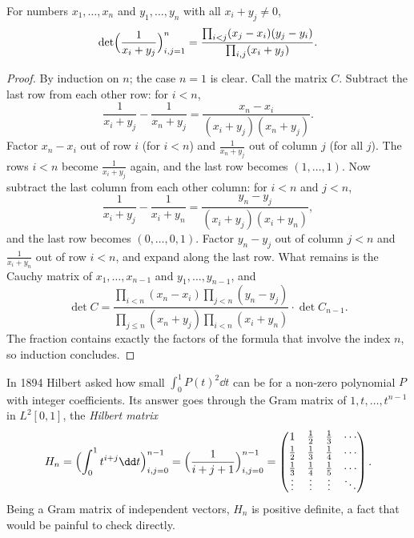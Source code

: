 \begin{theorem}[Cauchy, 1841]\label{thm:cauchydet}
For numbers $x_1,\dots,x_n$ and $y_1,\dots,y_n$ with all $x_i+y_j\ne0$,
\[
\det\Bigl(\frac1{x_i+y_j}\Bigr)_{i,j=1}^n=\frac{\prod_{i<j}(x_j-x_i)(y_j-y_i)}{\prod_{i,j}(x_i+y_j)}.
\]
\end{theorem}
\begin{proof}
By induction on $n$; the case $n=1$ is clear. Call the matrix $C$. Subtract the last row from each other row: for $i<n$,
\[
\frac1{x_i+y_j}-\frac1{x_n+y_j}=\frac{x_n-x_i}{(x_i+y_j)(x_n+y_j)}.
\]
Factor $x_n-x_i$ out of row $i$ (for $i<n$) and $\frac1{x_n+y_j}$ out of column $j$ (for all $j$). The rows $i<n$ become
$\frac1{x_i+y_j}$ again, and the last row becomes $(1,\dots,1)$. Now subtract the last column from each other column:
for $i<n$ and $j<n$,
\[
\frac1{x_i+y_j}-\frac1{x_i+y_n}=\frac{y_n-y_j}{(x_i+y_j)(x_i+y_n)},
\]
and the last row becomes $(0,\dots,0,1)$. Factor $y_n-y_j$ out of column $j<n$ and $\frac1{x_i+y_n}$ out of row $i<n$,
and expand along the last row. What remains is the Cauchy matrix of $x_1,\dots,x_{n-1}$ and $y_1,\dots,y_{n-1}$, and
\[
\det C=\frac{\prod_{i<n}(x_n-x_i)\prod_{j<n}(y_n-y_j)}{\prod_{j\le n}(x_n+y_j)\prod_{i<n}(x_i+y_n)}\cdot\det C_{n-1}.
\]
The fraction contains exactly the factors of the formula that involve the index $n$, so induction concludes.
\end{proof}

In 1894 Hilbert asked how small $\int_0^1P(t)^2\dd t$ can be for a non-zero polynomial $P$ with integer coefficients. Its
answer goes through the Gram matrix of $1,t,\dots,t^{n-1}$ in $L^2[0,1]$, the \emph{Hilbert matrix}
\[
H_n=\Bigl(\int_0^1t^{i+j}\dd t\Bigr)_{i,j=0}^{n-1}=\Bigl(\frac1{i+j+1}\Bigr)_{i,j=0}^{n-1}
=\begin{pmatrix}1&\frac12&\frac13&\cdots\\[2pt]\frac12&\frac13&\frac14&\cdots\\[2pt]\frac13&\frac14&\frac15&\cdots\\[-2pt]
\vdots&\vdots&\vdots&\ddots\end{pmatrix}.
\]
Being a Gram matrix of independent vectors, $H_n$ is positive definite, a fact that would be painful to check directly.

